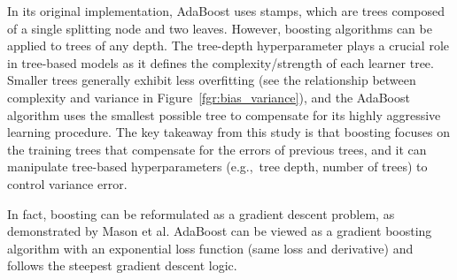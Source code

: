 \documentclass[main]{subfiles}
\begin{document}
In its original implementation, AdaBoost uses stamps, which are trees composed of a single splitting node and two leaves. However, boosting algorithms can be applied to trees of any depth. The tree-depth hyperparameter plays a crucial role in tree-based models as it defines the complexity/strength of each learner tree. Smaller trees generally exhibit less overfitting (see the relationship between complexity and variance in Figure~\ref{fgr:bias_variance}), and the AdaBoost algorithm uses the smallest possible tree to compensate for its highly aggressive learning procedure. The key takeaway from this study is that boosting focuses on the training trees that compensate for the errors of previous trees, and it can manipulate tree-based hyperparameters (e.g.,\ tree depth, number of trees) to control variance error.

In fact, boosting can be reformulated as a gradient descent problem, as demonstrated by Mason et al.\autocite{mason1999boosting} AdaBoost can be viewed as a gradient boosting algorithm with an exponential loss function (same loss and derivative) and follows the steepest gradient descent logic.\autocite{mason1999boosting,azencott2022introduction} 
\end{document}
